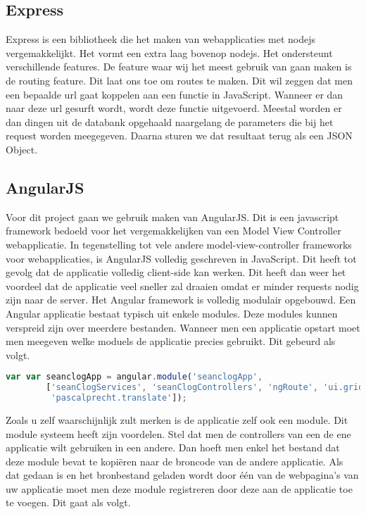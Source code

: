 \documentclass[a4paper,11pt]{article}
\begin{document}
\subsection{Express}
Express is een bibliotheek die het maken van webapplicaties met nodejs vergemakkelijkt. Het vormt een extra laag bovenop nodejs. Het ondersteunt verschillende features. De feature waar wij het meest gebruik van gaan maken is de routing feature. Dit laat ons toe om routes te maken. Dit wil zeggen dat men een bepaalde url gaat koppelen aan een functie in JavaScript. Wanneer er dan naar deze url gesurft wordt, wordt deze functie uitgevoerd. Meestal worden er dan dingen uit de databank opgehaald naargelang de parameters die bij het request worden meegegeven. Daarna sturen we dat resultaat terug als een JSON Object.

\subsection{AngularJS}

Voor dit project gaan we gebruik maken van AngularJS. Dit is een javascript framework bedoeld voor het vergemakkelijken van een Model View Controller webapplicatie. In tegenstelling tot vele andere model-view-controller frameworks voor webapplicaties, is AngularJS volledig geschreven in JavaScript. Dit heeft tot gevolg dat de applicatie volledig client-side kan werken. Dit heeft dan weer het voordeel dat de applicatie veel sneller zal draaien omdat er minder requests nodig zijn naar de server. Het Angular framework is volledig modulair opgebouwd. Een Angular applicatie bestaat typisch uit enkele modules. Deze modules kunnen verspreid zijn over meerdere bestanden. Wanneer men een applicatie opstart moet men meegeven welke moduels de applicatie precies gebruikt. Dit gebeurd als volgt.

\begin{lstlisting}[language=javascript]
var var seanclogApp = angular.module('seanclogApp',
		['seanClogServices', 'seanClogControllers', 'ngRoute', 'ui.grid',
		 'pascalprecht.translate']);
\end{lstlisting}

Zoals u zelf waarschijnlijk zult merken is de applicatie zelf ook een module. Dit module systeem heeft zijn voordelen. Stel dat men de controllers van een de ene applicatie wilt gebruiken in een andere. Dan hoeft men enkel het bestand dat deze module bevat te kopiëren naar de broncode van de andere applicatie. Als dat gedaan is en het bronbestand geladen wordt door één van de webpagina's van uw applicatie moet men deze module registreren door deze aan de applicatie toe te voegen. Dit gaat als volgt.
\end{document}
